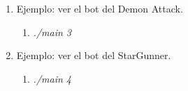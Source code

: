 \begin{enumerate}
\begin{enumerate}
\begin{enumerate}
        \end{enumerate}
        \item Ejemplo: ver el bot del Demon Attack.
        \begin{enumerate}
            \item \textit{./main 3}
        \end{enumerate}
        \item Ejemplo: ver el bot del StarGunner.
        \begin{enumerate}
            \item \textit{./main 4}
        \end{enumerate}
    \end{enumerate}
\end{enumerate}

\newpage